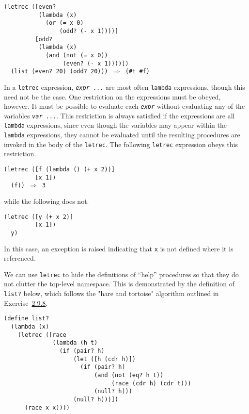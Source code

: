\begin{alltt}
(letrec ([even?\label{further_defn_even__odd_}
          (lambda (x)
            (or (= x 0)
                (odd? (- x 1))))]
         [odd?
          (lambda (x)
            (and (not (= x 0))
                 (even? (- x 1))))])
  (list (even? 20) (odd? 20))) \(\Rightarrow\) (\#{}t \#{}f)
\end{alltt}


In a \texttt{letrec} expression,
\texttt{\textit{expr} ...} are most often \texttt{lambda} expressions,
though this need not be the case.
One restriction on the expressions must be obeyed, however.
It must be possible to evaluate each \texttt{\textit{expr}} without
evaluating any of the variables \texttt{\textit{var} ...}.
This restriction is always satisfied if the expressions are all
\texttt{lambda} expressions, since even though the variables may appear
within the \texttt{lambda} expressions, they cannot be evaluated until
the resulting procedures are invoked in the body of the \texttt{letrec}.
The following \texttt{letrec} expression obeys this restriction.


\begin{alltt}
(letrec ([f (lambda () (+ x 2))]
         [x 1])
  (f)) \(\Rightarrow\) 3
\end{alltt}


while the following does not.


\begin{alltt}
(letrec ([y (+ x 2)]
         [x 1])
  y)
\end{alltt}


In this case, an exception is raised indicating that \texttt{x} is not
defined where it is referenced.


We can use \texttt{letrec} to hide the definitions of ``help'' procedures
so that they do not clutter the top-level namespace.
This is demonstrated by the definition of \label{further_s39}\texttt{list?} below, which
follows the "\label{further_s40}hare and tortoise" algorithm
outlined in Exercise \hyperref[start_g48]{2.9.8}.


\begin{alltt}
(define list?\label{further_defn_list_}
  (lambda (x)
    (letrec ([race
              (lambda (h t)
                (if (pair? h)
                    (let ([h (cdr h)])
                      (if (pair? h)
                          (and (not (eq? h t))
                               (race (cdr h) (cdr t)))
                          (null? h)))
                    (null? h)))])
      (race x x))))
\end{alltt}


